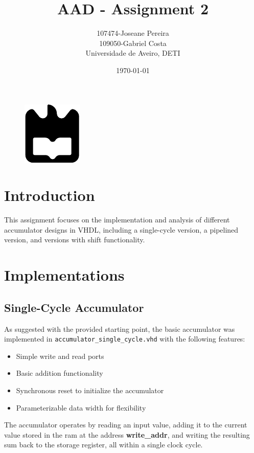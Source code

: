 \documentclass[a4paper,12pt]{article}
\title{AAD - Assignment 2}
\author{107474-Joseane Pereira \\
109050-Gabriel Costa \\
Universidade de Aveiro, DETI}
\date{\today}
\begin{document}
\begin{figure}
    \centering
    \includegraphics[width=0.3\linewidth]{ua.pdf}
    \label{fig:enter-label}
\end{figure}
\maketitle
\newpage
\tableofcontents
\newpage
\section{Introduction}
This assignment focuses on the implementation and analysis of different 
accumulator designs in VHDL, including a single-cycle version, a pipelined 
version, and versions with shift functionality.


\section{Implementations}

\subsection{Single-Cycle Accumulator}
As suggested with the provided starting point, the basic accumulator was implemented in
\texttt{accumulator\_single\_cycle.vhd} with the following features:
\begin{itemize}
    \item Simple write and read ports
    \item Basic addition functionality
    \item Synchronous reset to initialize the accumulator
    \item Parameterizable data width for flexibility
\end{itemize}

The accumulator operates by reading an input value, adding it to the current value stored in the ram at the address \textbf{write\_addr}, and writing the resulting sum back to the storage register, all within a single clock cycle.
\end{document}
